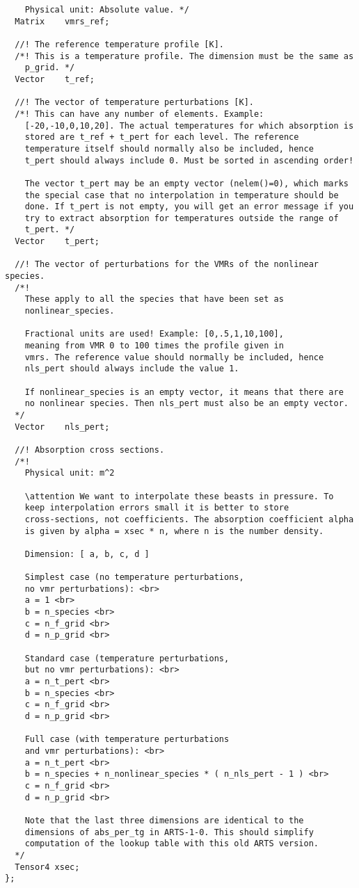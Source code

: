 {\begin{verbatim}
    Physical unit: Absolute value. */
  Matrix    vmrs_ref;

  //! The reference temperature profile [K].
  /*! This is a temperature profile. The dimension must be the same as
    p_grid. */
  Vector    t_ref;

  //! The vector of temperature perturbations [K].
  /*! This can have any number of elements. Example:
    [-20,-10,0,10,20]. The actual temperatures for which absorption is
    stored are t_ref + t_pert for each level. The reference
    temperature itself should normally also be included, hence 
    t_pert should always include 0. Must be sorted in ascending order!

    The vector t_pert may be an empty vector (nelem()=0), which marks
    the special case that no interpolation in temperature should be
    done. If t_pert is not empty, you will get an error message if you
    try to extract absorption for temperatures outside the range of
    t_pert. */
  Vector    t_pert;

  //! The vector of perturbations for the VMRs of the nonlinear species.
  /*!
    These apply to all the species that have been set as
    nonlinear_species.

    Fractional units are used! Example: [0,.5,1,10,100],
    meaning from VMR 0 to 100 times the profile given in
    vmrs. The reference value should normally be included, hence
    nls_pert should always include the value 1.

    If nonlinear_species is an empty vector, it means that there are
    no nonlinear species. Then nls_pert must also be an empty vector.
  */
  Vector    nls_pert;

  //! Absorption cross sections.
  /*!
    Physical unit: m^2

    \attention We want to interpolate these beasts in pressure. To
    keep interpolation errors small it is better to store
    cross-sections, not coefficients. The absorption coefficient alpha
    is given by alpha = xsec * n, where n is the number density.

    Dimension: [ a, b, c, d ]

    Simplest case (no temperature perturbations, 
    no vmr perturbations): <br>
    a = 1 <br>
    b = n_species <br>
    c = n_f_grid <br>
    d = n_p_grid <br>

    Standard case (temperature perturbations, 
    but no vmr perturbations): <br>
    a = n_t_pert <br>
    b = n_species <br>
    c = n_f_grid <br>
    d = n_p_grid <br>

    Full case (with temperature perturbations 
    and vmr perturbations): <br>
    a = n_t_pert <br>
    b = n_species + n_nonlinear_species * ( n_nls_pert - 1 ) <br>
    c = n_f_grid <br>
    d = n_p_grid <br>

    Note that the last three dimensions are identical to the
    dimensions of abs_per_tg in ARTS-1-0. This should simplify
    computation of the lookup table with this old ARTS version.
  */
  Tensor4 xsec;
};
\end{verbatim}
}

